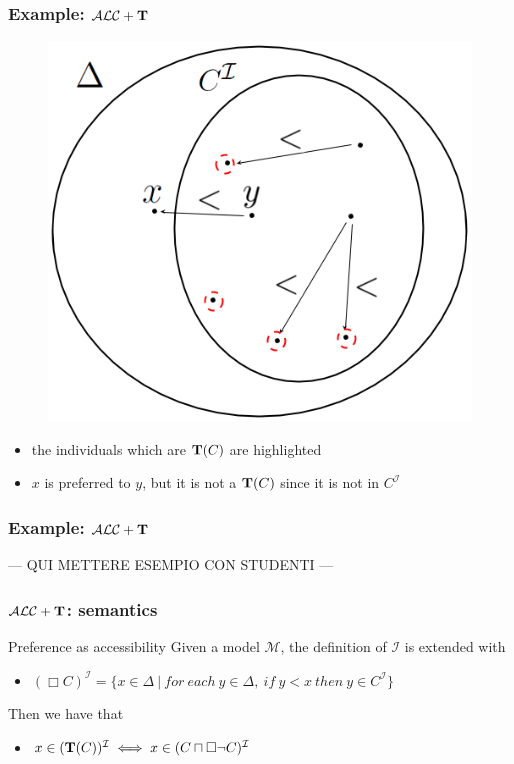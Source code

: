 \documentclass[serif,mathserif]{beamer}
\newcommand{\tip}{{\bf T}}
\newcommand{\alct}{\mathcal{ALC}+\tip}
\begin{document}
\begin{frame}
	\frametitle{Example: $\alct$}
	\begin{figure}[h]
	\centering
	\includegraphics[scale=.30]{img/diagram1_9.png}
	\end{figure}

	\begin{itemize}
	\item the individuals which are $\tip(C)$ are highlighted
	\item $x$ is preferred to $y$, but it is not a $\tip(C)$ since it is not in $C^{\mathcal{I}}$
	\end{itemize}
\end{frame}

\begin{frame}
	\frametitle{Example: $\alct$}
	--- QUI METTERE ESEMPIO CON STUDENTI ---
\end{frame}

\begin{frame}
	\frametitle{$\alct$: semantics}
	\begin{block}{Preference as accessibility}
	Given a model $\mathcal{M}$, the definition of $\mathcal{I}$ is extended with
	\begin{itemize}
	\item $(\Box C)^\mathcal{I} = \{ x \in \Delta \ |\ for\ each\ y \in \Delta,\ if\ y<x\ then\ y \in C^\mathcal{I}\}$
	\end{itemize}
	Then we have that
	\begin{itemize}
	\item $x\in(\tip(C))^\mathcal{I} \iff x \in(C\sqcap \Box \neg C)^\mathcal{I}$
	\end{itemize}
	\end{block}
\end{frame}
\end{document}
